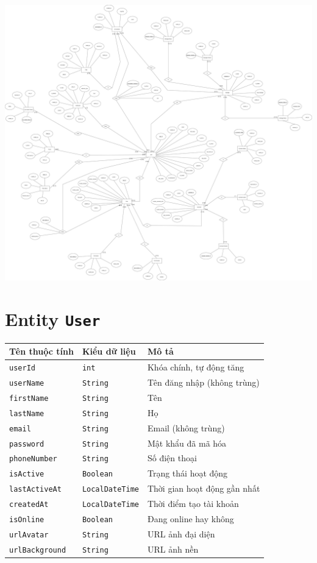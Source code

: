 
\includegraphics[width=\textwidth]{img/ERD_Instagram.png}

\section{Entity \texttt{User}}

\begin{longtable}{|>{\raggedright\arraybackslash}p{4cm}|>{\raggedright\arraybackslash}p{4cm}|>{\raggedright\arraybackslash}p{6cm}|}
\hline
\textbf{Tên thuộc tính} & \textbf{Kiểu dữ liệu} & \textbf{Mô tả} \\
\hline
\texttt{userId} & \texttt{int} & Khóa chính, tự động tăng \\
\hline
\texttt{userName} & \texttt{String} & Tên đăng nhập (không trùng) \\
\hline
\texttt{firstName} & \texttt{String} & Tên \\
\hline
\texttt{lastName} & \texttt{String} & Họ \\
\hline
\texttt{email} & \texttt{String} & Email (không trùng) \\
\hline
\texttt{password} & \texttt{String} & Mật khẩu đã mã hóa \\
\hline
\texttt{phoneNumber} & \texttt{String} & Số điện thoại \\
\hline
\texttt{isActive} & \texttt{Boolean} & Trạng thái hoạt động \\
\hline
\texttt{lastActiveAt} & \texttt{LocalDateTime} & Thời gian hoạt động gần nhất \\
\hline
\texttt{createdAt} & \texttt{LocalDateTime} & Thời điểm tạo tài khoản \\
\hline
\texttt{isOnline} & \texttt{Boolean} & Đang online hay không \\
\hline
\texttt{urlAvatar} & \texttt{String} & URL ảnh đại diện \\
\hline
\texttt{urlBackground} & \texttt{String} & URL ảnh nền \\
\hline
\end{longtable}

